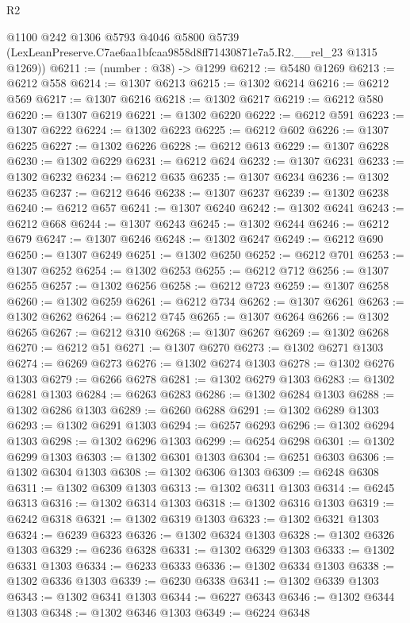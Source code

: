 \begin{lexlean}{R2}
\begin{coremodule}
      @1100
      @242
      @1306
      @5793
      @4046
      @5800
      @5739
      (LexLeanPreserve.C7ae6aa1bfcaa9858d8ff71430871e7a5.R2.__rel_23 @1315 @1269))
@6211 := (number : @38) -> @1299
@6212 := @5480 @1269
@6213 := @6212 @558
@6214 := @1307 @6213
@6215 := @1302 @6214
@6216 := @6212 @569
@6217 := @1307 @6216
@6218 := @1302 @6217
@6219 := @6212 @580
@6220 := @1307 @6219
@6221 := @1302 @6220
@6222 := @6212 @591
@6223 := @1307 @6222
@6224 := @1302 @6223
@6225 := @6212 @602
@6226 := @1307 @6225
@6227 := @1302 @6226
@6228 := @6212 @613
@6229 := @1307 @6228
@6230 := @1302 @6229
@6231 := @6212 @624
@6232 := @1307 @6231
@6233 := @1302 @6232
@6234 := @6212 @635
@6235 := @1307 @6234
@6236 := @1302 @6235
@6237 := @6212 @646
@6238 := @1307 @6237
@6239 := @1302 @6238
@6240 := @6212 @657
@6241 := @1307 @6240
@6242 := @1302 @6241
@6243 := @6212 @668
@6244 := @1307 @6243
@6245 := @1302 @6244
@6246 := @6212 @679
@6247 := @1307 @6246
@6248 := @1302 @6247
@6249 := @6212 @690
@6250 := @1307 @6249
@6251 := @1302 @6250
@6252 := @6212 @701
@6253 := @1307 @6252
@6254 := @1302 @6253
@6255 := @6212 @712
@6256 := @1307 @6255
@6257 := @1302 @6256
@6258 := @6212 @723
@6259 := @1307 @6258
@6260 := @1302 @6259
@6261 := @6212 @734
@6262 := @1307 @6261
@6263 := @1302 @6262
@6264 := @6212 @745
@6265 := @1307 @6264
@6266 := @1302 @6265
@6267 := @6212 @310
@6268 := @1307 @6267
@6269 := @1302 @6268
@6270 := @6212 @51
@6271 := @1307 @6270
@6273 := @1302 @6271 @1303
@6274 := @6269 @6273
@6276 := @1302 @6274 @1303
@6278 := @1302 @6276 @1303
@6279 := @6266 @6278
@6281 := @1302 @6279 @1303
@6283 := @1302 @6281 @1303
@6284 := @6263 @6283
@6286 := @1302 @6284 @1303
@6288 := @1302 @6286 @1303
@6289 := @6260 @6288
@6291 := @1302 @6289 @1303
@6293 := @1302 @6291 @1303
@6294 := @6257 @6293
@6296 := @1302 @6294 @1303
@6298 := @1302 @6296 @1303
@6299 := @6254 @6298
@6301 := @1302 @6299 @1303
@6303 := @1302 @6301 @1303
@6304 := @6251 @6303
@6306 := @1302 @6304 @1303
@6308 := @1302 @6306 @1303
@6309 := @6248 @6308
@6311 := @1302 @6309 @1303
@6313 := @1302 @6311 @1303
@6314 := @6245 @6313
@6316 := @1302 @6314 @1303
@6318 := @1302 @6316 @1303
@6319 := @6242 @6318
@6321 := @1302 @6319 @1303
@6323 := @1302 @6321 @1303
@6324 := @6239 @6323
@6326 := @1302 @6324 @1303
@6328 := @1302 @6326 @1303
@6329 := @6236 @6328
@6331 := @1302 @6329 @1303
@6333 := @1302 @6331 @1303
@6334 := @6233 @6333
@6336 := @1302 @6334 @1303
@6338 := @1302 @6336 @1303
@6339 := @6230 @6338
@6341 := @1302 @6339 @1303
@6343 := @1302 @6341 @1303
@6344 := @6227 @6343
@6346 := @1302 @6344 @1303
@6348 := @1302 @6346 @1303
@6349 := @6224 @6348

\end{coremodule}
\end{lexlean}
